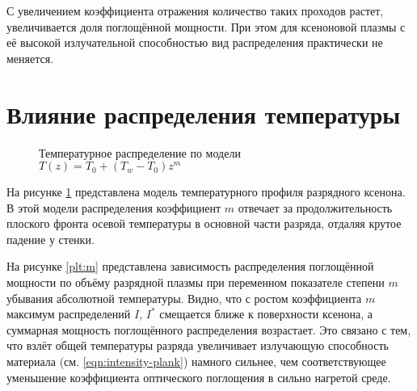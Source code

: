 С увеличением коэффициента отражения количество таких проходов растет, увеличивается доля поглощённой мощности.
При этом для ксеноновой плазмы с её высокой излучательной способностью вид распределения практически не меняется.

\section{Влияние распределения температуры}

\begin{figure}[H]
	\noindent{}
	\captionsetup{justification=centering}
	\caption{Температурное распределение по модели $T(z) = T_0 + (T_w - T_0)z^m$}
	\label{plt:temperature}
\end{figure}

На рисунке \ref{plt:temperature} представлена модель температурного профиля разрядного ксенона. В этой модели распределения коэффициент $m$ отвечает за продолжительность плоского фронта осевой температуры в основной части разряда, отдаляя крутое падение у стенки.

На рисунке \ref{plt:m} представлена зависимость распределения поглощённой мощности по объёму разрядной плазмы при переменном показателе степени $m$ убывания абсолютной температуры.
Видно, что с ростом коэффициента $m$ максимум распределений $I$, $I^*$ смещается ближе к поверхности ксенона, а суммарная мощность поглощённого распределения возрастает.
Это связано с тем, что взлёт общей температуры разряда увеличивает излучающую способность материала (см. \eqref{eqn:intensity-plank}) намного сильнее, чем соответствующее уменьшение коэффициента оптического поглощения в сильно нагретой среде.

